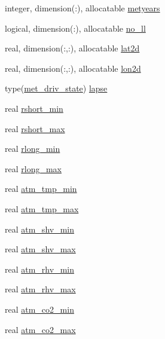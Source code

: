 \begin{DoxyCompactItemize}
\item 
integer, dimension(\+:), allocatable \hyperlink{namespacemet__driver__coms_af128086aff438c098cbb171df11b5b50}{metyears}
\item 
logical, dimension(\+:), allocatable \hyperlink{namespacemet__driver__coms_a593e5e00920bf69cc5606914b9af1441}{no\+\_\+ll}
\item 
real, dimension(\+:,\+:), allocatable \hyperlink{namespacemet__driver__coms_ad4ba08a0bb7a7d239acca24ad643df43}{lat2d}
\item 
real, dimension(\+:,\+:), allocatable \hyperlink{namespacemet__driver__coms_a86a7d638d5a38f95de4804d9e6b72f86}{lon2d}
\item 
type(\hyperlink{structmet__driver__coms_1_1met__driv__state}{met\+\_\+driv\+\_\+state}) \hyperlink{namespacemet__driver__coms_a685acd690e0892bcfd7a506c166c17a2}{lapse}
\item 
real \hyperlink{namespacemet__driver__coms_a013356bcc8073da8ae3d49d5976638ea}{rshort\+\_\+min}
\item 
real \hyperlink{namespacemet__driver__coms_a219937d69ab4b750cfc581131fcb919d}{rshort\+\_\+max}
\item 
real \hyperlink{namespacemet__driver__coms_a3b4038f5f9bd27b10804eb3708f59eee}{rlong\+\_\+min}
\item 
real \hyperlink{namespacemet__driver__coms_aae1dfc2e08ed7190ca55f26184c58808}{rlong\+\_\+max}
\item 
real \hyperlink{namespacemet__driver__coms_a3012153d59cb39b7b6b7d2cb707960f1}{atm\+\_\+tmp\+\_\+min}
\item 
real \hyperlink{namespacemet__driver__coms_a672d84e38ae3a305d1b2b616cc40fd65}{atm\+\_\+tmp\+\_\+max}
\item 
real \hyperlink{namespacemet__driver__coms_a013a5b6c2883c734ae9c54853b87d061}{atm\+\_\+shv\+\_\+min}
\item 
real \hyperlink{namespacemet__driver__coms_af5f857e4fab7c7d10c849dfce549c5bb}{atm\+\_\+shv\+\_\+max}
\item 
real \hyperlink{namespacemet__driver__coms_a0a0fdcc78995f5627a278a0ad970279b}{atm\+\_\+rhv\+\_\+min}
\item 
real \hyperlink{namespacemet__driver__coms_a2e9657af0efaad7d0e12e6a42cc8df71}{atm\+\_\+rhv\+\_\+max}
\item 
real \hyperlink{namespacemet__driver__coms_ae3e4146e8ca9281e8ba30db39ece0e43}{atm\+\_\+co2\+\_\+min}
\item 
real \hyperlink{namespacemet__driver__coms_aec2e25a82647949db4d9bbaafb62220c}{atm\+\_\+co2\+\_\+max}

\end{DoxyCompactItemize}
